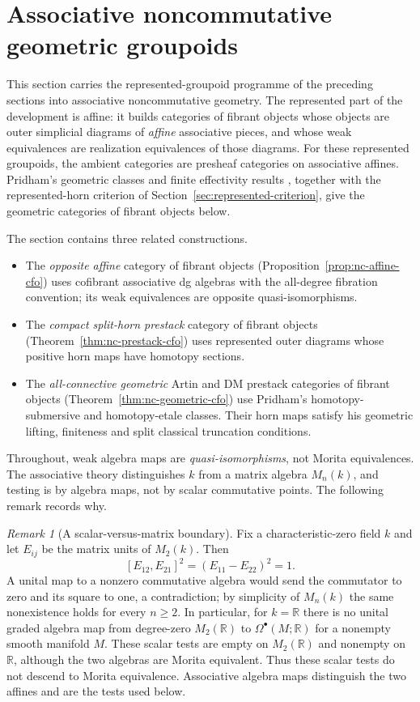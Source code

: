 \documentclass[12pt]{amsart}
\theoremstyle{definition}
\theoremstyle{remark}
\newtheorem{rem}[thm]{Remark}
\numberwithin{equation}{section}
\newcommand{\R}{\mathbb R}
\begin{document}
\section{Associative noncommutative geometric groupoids}
\label{sec:noncommutative-geometry}

This section carries the represented-groupoid programme of the
preceding sections into associative noncommutative geometry.
The represented part of the development is affine: it builds
categories of fibrant objects whose objects are outer simplicial
diagrams of \emph{affine} associative pieces, and whose weak
equivalences are realization equivalences of those diagrams.
For these represented groupoids, the ambient categories
are presheaf categories on associative affines.
Pridham's geometric classes and finite effectivity
results \cite{PridhamNC2023,Pridham2013}, together with the
represented-horn criterion of
Section~\ref{sec:represented-criterion}, give the geometric
categories of fibrant objects below.

The section contains three related constructions.
\begin{itemize}
\item The \emph{opposite affine} category of fibrant objects
      (Proposition~\ref{prop:nc-affine-cfo}) uses cofibrant
      associative dg algebras with the all-degree fibration
      convention; its weak equivalences are opposite
      quasi-isomorphisms.
\item The \emph{compact split-horn prestack} category of fibrant
      objects (Theorem~\ref{thm:nc-prestack-cfo}) uses represented
      outer diagrams whose positive horn maps have homotopy
      sections.
\item The \emph{all-connective geometric} Artin and DM
      prestack categories of fibrant objects
      (Theorem~\ref{thm:nc-geometric-cfo}) use Pridham's
      homotopy-submersive and homotopy-etale classes. Their
      horn maps satisfy his geometric lifting, finiteness
      and split classical truncation conditions.
\end{itemize}
Throughout, weak algebra maps are \emph{quasi-isomorphisms}, not
Morita equivalences. The associative theory
distinguishes $k$ from a matrix algebra $M_n(k)$, and testing is
by algebra maps, not by scalar commutative points. The following
remark records why.

\begin{rem}[A scalar-versus-matrix boundary]
\label{rem:nc-scalar-matrix}
Fix a characteristic-zero field $k$ and let $E_{ij}$ be the
matrix units of $M_2(k)$. Then
\[
 [E_{12},E_{21}]^2=(E_{11}-E_{22})^2=1 .
\]
A unital map to a nonzero commutative algebra would send the
commutator to zero and its square to one, a contradiction; by
simplicity of $M_n(k)$ the same nonexistence holds for every
$n\ge2$. In particular, for $k=\R$ there is no unital graded
algebra map from degree-zero $M_2(\R)$ to
$\Omega^\bullet(M;\R)$ for a nonempty smooth manifold $M$.
These scalar tests are empty on $M_2(\R)$ and nonempty on $\R$,
although the two algebras are Morita equivalent. Thus these
scalar tests do not descend to Morita equivalence. Associative
algebra maps distinguish the two affines and are the tests
used below.
\end{rem}
\end{document}
